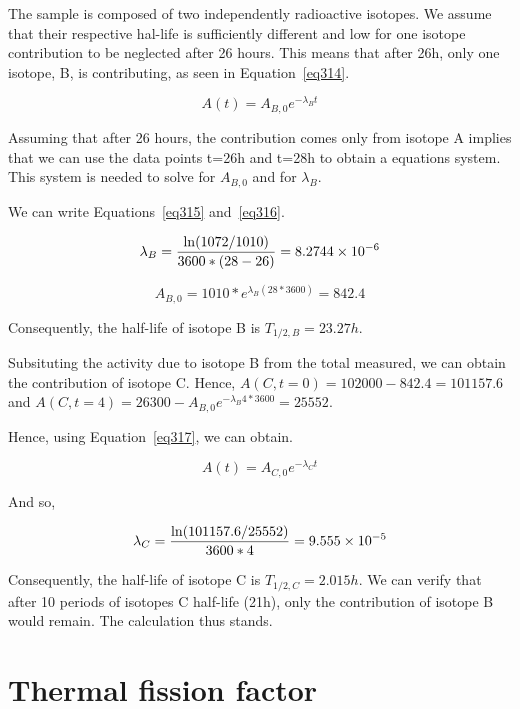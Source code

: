 The sample is composed of two independently radioactive isotopes. We assume that their respective hal-life is sufficiently different and low for one isotope contribution to be neglected after 26 hours. This means that after 26h, only one isotope, B, is contributing, as seen in Equation~\ref{eq314}.

\begin{equation}\label{eq314}
A(t) = A_{B, 0}e^{-\lambda_B t}
\end{equation}

Assuming that after 26 hours, the contribution comes only from isotope A implies that we can use the data points t=26h and t=28h to obtain a equations system. This system is needed to solve for $A_{B, 0}$ and for $\lambda_B$.

We can write Equations~\ref{eq315} and~\ref{eq316}.


\begin{equation}\label{eq315}
\lambda_B = \frac{\ln(1072/1010)}{3600 * (28-26)} = \text{\num{8.2744e-6}}
\end{equation}

\begin{equation}\label{eq316}
A_{B,0} = 1010 * e^{\lambda_B (28*3600)} = 842.4
\end{equation}

Consequently, the half-life of isotope B is $T_{1/2, B} = 23.27h$.

Subsituting the activity due to isotope B from the total measured, we can obtain the contribution of isotope C. Hence, $A(C, t=0) = 102000-842.4 = 101157.6$ and $A(C, t=4) = 26300 - A_{B, 0}e^{-\lambda_B 4*3600} = 25552$.

Hence, using Equation~\ref{eq317}, we can obtain.


\begin{equation}\label{eq317}
A(t) = A_{C, 0}e^{-\lambda_C t}
\end{equation}

And so,

\begin{equation}\label{eq318}
\lambda_C = \frac{\ln(101157.6/25552)}{3600 * 4} = \text{\num{9.555e-5}}
\end{equation}


Consequently, the half-life of isotope C is $T_{1/2, C} = 2.015h$. We can verify that after 10 periods of isotopes C half-life (21h), only the contribution of isotope B would remain. The calculation thus stands.

\section{Thermal fission factor}
\label{prob33}

